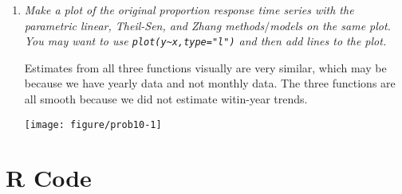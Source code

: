 \documentclass[11pt]{article}\usepackage[]{graphicx}\usepackage[]{color}
\makeatletter
\def\maxwidth{ %
  \ifdim\Gin@nat@width>\linewidth
    \linewidth
  \else
    \Gin@nat@width
  \fi
}
\newenvironment{knitrout}{}{} %
\makeatother
\begin{document}
\begin{enumerate}
The 95\% confidence interval using {\texttt confint(mblm.object)} was (\ensuremath{-0.0003698}, \ensuremath{-0.0002405}). The 95\% confidence interval using {\texttt zyp.confint(zyp.sen.object)} was (\ensuremath{-0.0005074}, \ensuremath{-0.0001099}).

The widths are nearly the same, but the {\texttt confint(mblm())} confidence interval is shifted up slightly compared to the {\texttt confint.zyp()} confidence interval. It is interesting that there is any difference as theoretically, they are both creating a 95\% confidence interval for the slope coefficient for the Theil-Sen estimate.


\item%
{\it Make a plot of the original proportion response time series with the parametric linear, Theil-Sen, and Zhang methods$/$models on the same plot. You may want to use \verb|plot(y~x,type="l")| and then add lines to the plot.}

Estimates from all three functions visually are very similar, which may be because we have yearly data and not monthly data. The three functions are all smooth because we did not estimate witin-year trends.


\begin{knitrout}\footnotesize
{}\color{fgcolor}

{\centering \texttt{[image: figure/prob10-1]} 

}



\end{knitrout}



\end{enumerate}

\pagebreak
\appendix
\section*{R Code}
\end{document}
